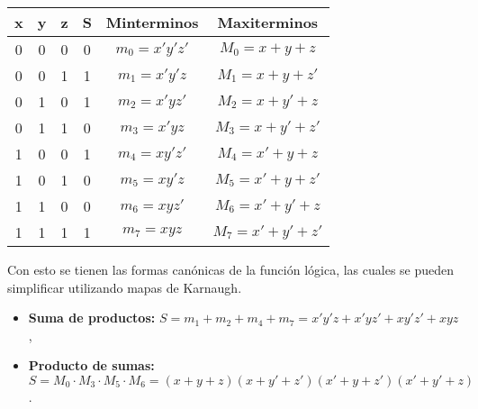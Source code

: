 \begin{table}[h]
    \centering
    \begin{tabular}{cccccc}
        \toprule
        \textbf{x} & \textbf{y} & \textbf{z} & \textbf{S} & \textbf{Minterminos} & \textbf{Maxiterminos}\\
        \midrule
        0 & 0 & 0 & 0 & $m_0 = x'y'z'$ & $M_0 = x+y+z$\\
        0 & 0 & 1 & 1 & $m_1 = x'y'z$ & $M_1 = x+y+z'$\\
        0 & 1 & 0 & 1 & $m_2 = x'yz'$ & $M_2 = x+y'+z$\\
        0 & 1 & 1 & 0 & $m_3 = x'yz$ & $M_3 = x+y'+z'$\\
        1 & 0 & 0 & 1 & $m_4 = xy'z'$ & $M_4 = x'+y+z$\\
        1 & 0 & 1 & 0 & $m_5 = xy'z$ & $M_5 = x'+y+z'$\\
        1 & 1 & 0 & 0 & $m_6 = xyz'$ & $M_6 = x'+y'+z$\\
        1 & 1 & 1 & 1 & $m_7 = xyz$ & $M_7 = x'+y'+z'$\\
        \bottomrule
    \end{tabular}
\end{table}

Con esto se tienen las formas canónicas de la función lógica, las cuales se pueden simplificar utilizando mapas de Karnaugh.
\begin{itemize}
    \item \textbf{Suma de productos:} $S = m_1 + m_2 + m_4 + m_7 = x'y'z + x'yz' + xy'z' + xyz$,
    \item \textbf{Producto de sumas:} $S = M_0 \cdot M_3 \cdot M_5 \cdot M_6 = (x+y+z)(x+y'+z')(x'+y+z')(x'+y'+z)$.
\end{itemize}
